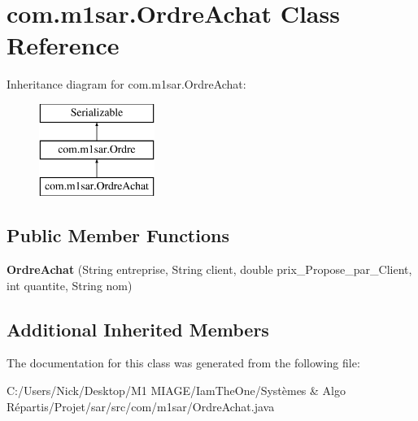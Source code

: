 \hypertarget{classcom_1_1m1sar_1_1_ordre_achat}{}\section{com.\+m1sar.\+Ordre\+Achat Class Reference}
\label{classcom_1_1m1sar_1_1_ordre_achat}
Inheritance diagram for com.\+m1sar.\+Ordre\+Achat\+:\begin{figure}[H]
\begin{center}
\leavevmode
\includegraphics[height=3.000000cm]{classcom_1_1m1sar_1_1_ordre_achat}
\end{center}
\end{figure}
\subsection*{Public Member Functions}
\begin{DoxyCompactItemize}
\item 
\mbox{\label{classcom_1_1m1sar_1_1_ordre_achat_a5448a8f8859556109bbbbcbf136f40cb}} 
{\bfseries Ordre\+Achat} (String entreprise, String client, double prix\+\_\+\+Propose\+\_\+par\+\_\+\+Client, int quantite, String nom)
\end{DoxyCompactItemize}
\subsection*{Additional Inherited Members}


The documentation for this class was generated from the following file\+:\begin{DoxyCompactItemize}
\item 
C\+:/\+Users/\+Nick/\+Desktop/\+M1 M\+I\+A\+G\+E/\+Iam\+The\+One/\+Systèmes \& Algo Répartis/\+Projet/sar/src/com/m1sar/Ordre\+Achat.\+java\end{DoxyCompactItemize}
